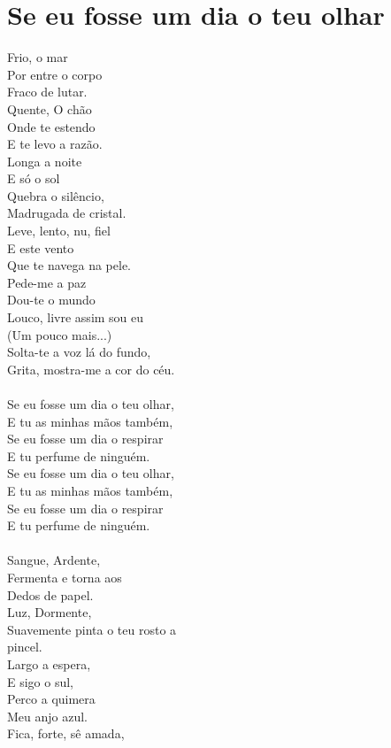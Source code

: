 \documentclass{article}
\begin{document}
\section{ Se eu fosse um dia o teu olhar }
Frio, o mar\\
Por entre o corpo\\
Fraco de lutar.\\
Quente, O chão\\
Onde te estendo\\
E te levo a razão.\\
Longa a noite\\
E só o sol\\
Quebra o silêncio,\\
Madrugada de cristal.\\
Leve, lento, nu, fiel\\
E este vento\\
Que te navega na pele.\\
Pede-me a paz\\
Dou-te o mundo\\
Louco, livre assim sou eu\\
(Um pouco mais...)\\
Solta-te a voz lá do fundo,\\
Grita, mostra-me a cor do céu.\\
\\
Se eu fosse um dia o teu olhar,\\
E tu as minhas mãos também,\\
Se eu fosse um dia o respirar\\
E tu perfume de ninguém.\\
Se eu fosse um dia o teu olhar,\\
E tu as minhas mãos também,\\
Se eu fosse um dia o respirar\\
E tu perfume de ninguém.\\
\\
Sangue, Ardente,\\
Fermenta e torna aos\\
Dedos de papel.\\
Luz, Dormente,\\
Suavemente pinta o teu rosto a\\
pincel.\\
Largo a espera,\\
E sigo o sul,\\
Perco a quimera\\
Meu anjo azul.\\
Fica, forte, sê amada,\\
\end{document}
